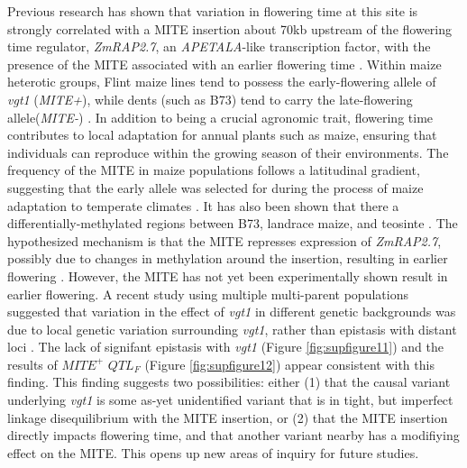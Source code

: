 \documentclass[article,9pt,twocolumn,twoside]{rilabRxiv}
\begin{document}
Previous research  has shown that variation in flowering time at this site is strongly correlated with a MITE insertion about 70kb upstream of the flowering time regulator, \emph{ZmRAP2.7}, an \emph{APETALA}-like transcription factor, with the presence of the MITE associated with an earlier flowering time \cite{Castelletti}.
Within maize heterotic groups, Flint maize lines tend to possess the early-flowering allele of \emph{vgt1} (\emph{MITE+}), while dents (such as B73) tend to carry the late-flowering allele(\emph{MITE-}) \citep{Salvi}.
In addition to being a crucial agronomic trait, flowering time contributes to local adaptation for annual plants such as maize, ensuring that individuals can reproduce within the growing season of their environments.
The frequency of the MITE in maize populations follows a latitudinal gradient, suggesting that the early allele was selected for during the process of maize adaptation to temperate climates \cite{Navarro}.
It has also been shown that there a differentially-methylated regions between B73, landrace maize, and teosinte \cite{Xu}.
The hypothesized mechanism is that the MITE represses expression of \emph{ZmRAP2.7}, possibly due to changes in methylation around the insertion, resulting in earlier flowering \cite{Castelletti}.
However, the MITE has not yet been experimentally shown result in earlier flowering.
A recent study using multiple multi-parent populations suggested that variation in the effect of \emph{vgt1} in different genetic backgrounds was due to local genetic variation surrounding \emph{vgt1}, rather than epistasis with distant loci \citep{Rio}.
The lack of signifant epistasis with \emph{vgt1} (Figure \ref{fig:supfigure11}) and the results of $MITE^+$ $QTL_F$ (Figure \ref{fig:supfigure12}) appear consistent with this finding.
This finding suggests two possibilities: either (1) that the causal variant underlying \emph{vgt1} is some as-yet unidentified variant that is in tight, but imperfect linkage disequilibrium with the MITE insertion, or (2) that the MITE insertion directly impacts flowering time, and that another variant nearby has a modifiying effect on the MITE.
This opens up new areas of inquiry for future studies.
\end{document}
